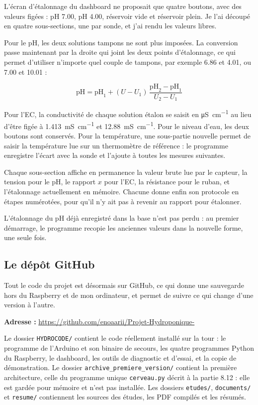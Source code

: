 L'écran d'étalonnage du dashboard ne proposait que quatre boutons, avec des valeurs figées : pH \num{7,00}, pH \num{4,00}, réservoir vide et réservoir plein. Je l'ai découpé en quatre sous-sections, une par sonde, et j'ai rendu les valeurs libres.

Pour le pH, les deux solutions tampons ne sont plus imposées. La conversion passe maintenant par la droite qui joint les deux points d'étalonnage, ce qui permet d'utiliser n'importe quel couple de tampons, par exemple \num{6,86} et \num{4,01}, ou \num{7,00} et \num{10,01} :

\[ \mathrm{pH} = \mathrm{pH}_1 + (U - U_1)\,\frac{\mathrm{pH}_2 - \mathrm{pH}_1}{U_2 - U_1} \]

Pour l'EC, la conductivité de chaque solution étalon se saisit en \unit{\micro S\per cm} au lieu d'être figée à \qty{1,413}{mS\per cm} et \qty{12,88}{mS\per cm}. Pour le niveau d'eau, les deux boutons sont conservés. Pour la température, une sous-partie nouvelle permet de saisir la température lue sur un thermomètre de référence : le programme enregistre l'écart avec la sonde et l'ajoute à toutes les mesures suivantes.

Chaque sous-section affiche en permanence la valeur brute lue par le capteur, la tension pour le pH, le rapport $x$ pour l'EC, la résistance pour le ruban, et l'étalonnage actuellement en mémoire. Chacune donne enfin son protocole en étapes numérotées, pour qu'il n'y ait pas à revenir au rapport pour étalonner.

L'étalonnage du pH déjà enregistré dans la base n'est pas perdu : au premier démarrage, le programme recopie les anciennes valeurs dans la nouvelle forme, une seule fois.

\subsection{Le dépôt GitHub}

Tout le code du projet est désormais sur GitHub, ce qui donne une sauvegarde hors du Raspberry et de mon ordinateur, et permet de suivre ce qui change d'une version à l'autre.

\textbf{Adresse :} \url{https://github.com/enoaarii/Projet-Hydroponique-}

Le dossier \texttt{HYDROCODE/} contient le code réellement installé sur la tour : le programme de l'Arduino et son binaire de secours, les quatre programmes Python du Raspberry, le dashboard, les outils de diagnostic et d'essai, et la copie de démonstration. Le dossier \texttt{archive\_premiere\_version/} contient la première architecture, celle du programme unique \texttt{cerveau.py} décrit à la partie 8.12 : elle est gardée pour mémoire et n'est pas installée. Les dossiers \texttt{etudes/}, \texttt{documents/} et \texttt{resume/} contiennent les sources des études, les PDF compilés et les résumés.

